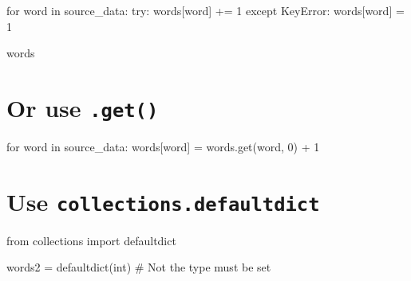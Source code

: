 \documentclass[
  letterpaper,
  DIV=11,
  numbers=noendperiod]{scrreprt}
\newenvironment{Shaded}{\begin{snugshade}}{\end{snugshade}}
\newcommand{\BuiltInTok}[1]{\textcolor[rgb]{0.00,0.23,0.31}{#1}}
\newcommand{\CommentTok}[1]{\textcolor[rgb]{0.37,0.37,0.37}{#1}}
\newcommand{\ControlFlowTok}[1]{\textcolor[rgb]{0.00,0.23,0.31}{#1}}
\newcommand{\DecValTok}[1]{\textcolor[rgb]{0.68,0.00,0.00}{#1}}
\newcommand{\ImportTok}[1]{\textcolor[rgb]{0.00,0.46,0.62}{#1}}
\newcommand{\KeywordTok}[1]{\textcolor[rgb]{0.00,0.23,0.31}{#1}}
\newcommand{\NormalTok}[1]{\textcolor[rgb]{0.00,0.23,0.31}{#1}}
\newcommand{\OperatorTok}[1]{\textcolor[rgb]{0.37,0.37,0.37}{#1}}
\newcommand{\PreprocessorTok}[1]{\textcolor[rgb]{0.68,0.00,0.00}{#1}}
\begin{document}
\begin{Shaded}
\begin{Highlighting}[]
\ControlFlowTok{for}\NormalTok{ word }\KeywordTok{in}\NormalTok{ source\_data:}
    \ControlFlowTok{try}\NormalTok{:}
\NormalTok{        words[word] }\OperatorTok{+=} \DecValTok{1}
    \ControlFlowTok{except} \PreprocessorTok{KeyError}\NormalTok{:}
\NormalTok{        words[word] }\OperatorTok{=} \DecValTok{1}
\end{Highlighting}
\end{Shaded}

\begin{Shaded}
\begin{Highlighting}[]
\NormalTok{words}
\end{Highlighting}
\end{Shaded}

\hypertarget{or-use-.get}{%
\section{\texorpdfstring{Or use
\texttt{.get()}}{Or use .get()}}\label{or-use-.get}}

\begin{Shaded}
\begin{Highlighting}[]
\ControlFlowTok{for}\NormalTok{ word }\KeywordTok{in}\NormalTok{ source\_data:}
\NormalTok{    words[word] }\OperatorTok{=}\NormalTok{ words.get(word, }\DecValTok{0}\NormalTok{) }\OperatorTok{+} \DecValTok{1}
\end{Highlighting}
\end{Shaded}

\hypertarget{use-collections.defaultdict}{%
\section{\texorpdfstring{Use
\texttt{collections.defaultdict}}{Use collections.defaultdict}}\label{use-collections.defaultdict}}

\begin{Shaded}
\begin{Highlighting}[]
\ImportTok{from}\NormalTok{ collections }\ImportTok{import}\NormalTok{ defaultdict}
\end{Highlighting}
\end{Shaded}

\begin{Shaded}
\begin{Highlighting}[]
\NormalTok{words2 }\OperatorTok{=}\NormalTok{ defaultdict(}\BuiltInTok{int}\NormalTok{) }\CommentTok{\# Not the type must be set}
\end{Highlighting}
\end{Shaded}
\end{document}

